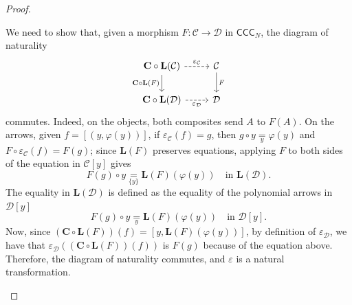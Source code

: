 \begin{proof}
\begin{itemize}
        We need to show that, given a morphism $F : \mathcal C \to \mathcal D$ in $\mathsf{CCC}_N$, the diagram of naturality
        \[\begin{tikzcd}
            {\mathbf C \circ \mathbf L(\mathcal C)} & {\mathcal C} \\
            {\mathbf C \circ \mathbf L(\mathcal D)} & {\mathcal D}
            \arrow["{\varepsilon_{\mathcal C}}", dashed, from=1-1, to=1-2]
            \arrow["{\mathbf C \circ \mathbf L(F)}"', from=1-1, to=2-1]
            \arrow["F", from=1-2, to=2-2]
            \arrow["{\varepsilon_{\mathcal D}}"', dashed, from=2-1, to=2-2]
        \end{tikzcd}\]
        commutes. Indeed, on the objects, both composites send $A$ to $F(A)$. On the arrows, given $f = [(y,\varphi(y))]$, if $\varepsilon_\mathcal C(f)=g$, then $g \circ y \underset{y}{=} \varphi(y)$ and $F \circ \varepsilon_\mathcal C(f) = F(g)$;
        since $\mathbf L(F)$ preserves equations, applying $F$ to both sides of the equation in $\mathcal C[y]$ gives
        \[ F(g) \circ y \underset{\{y\}}{=} \mathbf L(F)(\varphi(y)) \quad \text{in } \mathbf L(\mathcal D). \]
        The equality in $\mathbf L(\mathcal D)$ is defined as the equality of the polynomial arrows in $\mathcal D[y]$
        \[ F(g) \circ y \underset{y}{=} \mathbf L(F)(\varphi(y)) \quad \text{in } \mathcal D[y]. \]
        Now, since $(\mathbf C \circ \mathbf L(F))(f) = [y,\mathbf L(F)(\varphi(y))]$, by definition of $\varepsilon_\mathcal D$, we have that $\varepsilon_\mathcal D((\mathbf C\circ\mathbf L(F))(f))$ is $F(g)$ because of the equation above.
        Therefore, the diagram of naturality commutes, and $\varepsilon$ is a natural transformation.


\end{itemize}
\end{proof}

